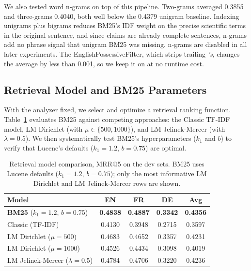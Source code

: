 We also tested word n-grams on top of this pipeline. Two-grams averaged 0.3855 and three-grams 0.4040, both well below the 0.4379 unigram baseline. Indexing unigrams plus bigrams reduces BM25's IDF weight on the precise scientific terms in the original sentence, and since claims are already complete sentences, n-grams add no phrase signal that unigram BM25 was missing. n-grams are disabled in all later experiments. The EnglishPossessiveFilter, which strips trailing \emph{'s}, changes the average by less than 0.001, so we keep it on at no runtime cost.

\subsection{Retrieval Model and BM25 Parameters}
\label{subsec:res-model}

With the analyzer fixed, we select and optimize a retrieval ranking function. Table~\ref{tab:model-comparison} evaluates BM25 against competing approaches: the Classic TF-IDF model, LM Dirichlet (with $\mu \in \{500, 1000\}$), and LM Jelinek-Mercer (with $\lambda{=}0.5$). We then systematically test BM25's hyperparameters ($k_1$ and $b$) to verify that Lucene's defaults ($k_1{=}1.2$, $b{=}0.75$) are optimal.

\begin{table}[!ht]
    \caption{Retrieval model comparison, MRR@5 on the dev sets. BM25 uses Lucene defaults ($k_1{=}1.2$, $b{=}0.75$); only the most informative LM Dirichlet and LM Jelinek-Mercer rows are shown.}
    \label{tab:model-comparison}
    \centering
    \begin{tabular}{lcccc}
        \toprule
        Model & EN & FR & DE & Avg \\
        \midrule
        \textbf{BM25} ($k_1{=}1.2$, $b{=}0.75$)     & \textbf{0.4838} & \textbf{0.4887} & \textbf{0.3342} & \textbf{0.4356} \\
        Classic (TF-IDF)                             & 0.4130 & 0.3948 & 0.2715 & 0.3597 \\
        LM Dirichlet ($\mu{=}500$)                   & 0.4683 & 0.4652 & 0.3357 & 0.4231 \\
        LM Dirichlet ($\mu{=}1000$)                  & 0.4526 & 0.4434 & 0.3098 & 0.4019 \\
        LM Jelinek-Mercer ($\lambda{=}0.5$)          & 0.4784 & 0.4706 & 0.3220 & 0.4236 \\
        \bottomrule
    \end{tabular}
\end{table}

